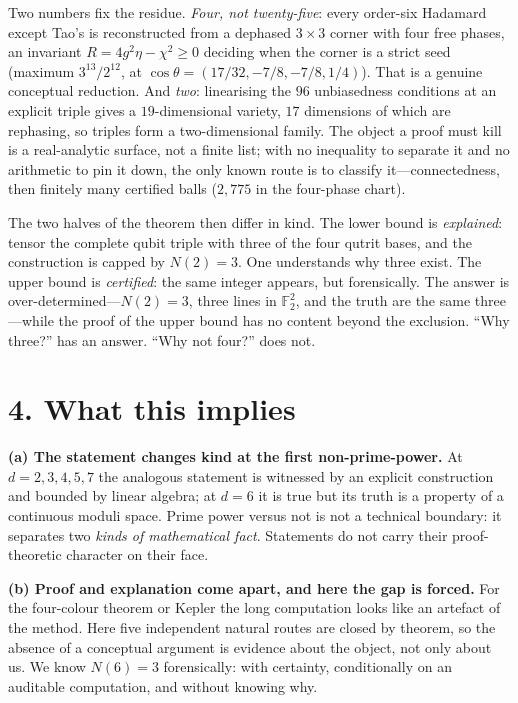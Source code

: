 \documentclass[10pt]{article}
\begin{document}
Two numbers fix the residue. \emph{Four, not twenty-five}: every order-six Hadamard except Tao's is
reconstructed from a dephased $3\times3$ corner with four free phases, an invariant
$R=4g^2\eta-\chi^2\ge0$ deciding when the corner is a strict seed (maximum $3^{13}/2^{12}$, at
$\cos\theta=(17/32,-7/8,-7/8,1/4)$). That is a genuine conceptual reduction. And \emph{two}: linearising
the $96$ unbiasedness conditions at an explicit triple gives a $19$-dimensional variety, $17$ dimensions
of which are rephasing, so triples form a two-dimensional family. The object a proof must kill is a
real-analytic surface, not a finite list; with no inequality to separate it and no arithmetic to pin it
down, the only known route is to classify it---connectedness, then finitely many certified balls
($2{,}775$ in the four-phase chart).

The two halves of the theorem then differ in kind. The lower bound is \emph{explained}: tensor the
complete qubit triple with three of the four qutrit bases, and the construction is capped by $N(2)=3$.
One understands why three exist. The upper bound is \emph{certified}: the same integer appears, but
forensically. The answer is over-determined---$N(2)=3$, three lines in $\mathbb{F}_2^2$, and the truth
are the same three---while the proof of the upper bound has no content beyond the exclusion. ``Why
three?'' has an answer. ``Why not four?'' does not.

\section*{4. What this implies}

\textbf{(a) The statement changes kind at the first non-prime-power.} At $d=2,3,4,5,7$ the analogous
statement is witnessed by an explicit construction and bounded by linear algebra; at $d=6$ it is true but
its truth is a property of a continuous moduli space. Prime power versus not is not a technical boundary:
it separates two \emph{kinds of mathematical fact}. Statements do not carry their proof-theoretic
character on their face.

\textbf{(b) Proof and explanation come apart, and here the gap is forced.} For the four-colour theorem or
Kepler the long computation looks like an artefact of the method. Here five independent natural routes
are closed by theorem, so the absence of a conceptual argument is evidence about the object, not only
about us. We know $N(6)=3$ forensically: with certainty, conditionally on an auditable computation, and
without knowing why.
\end{document}
